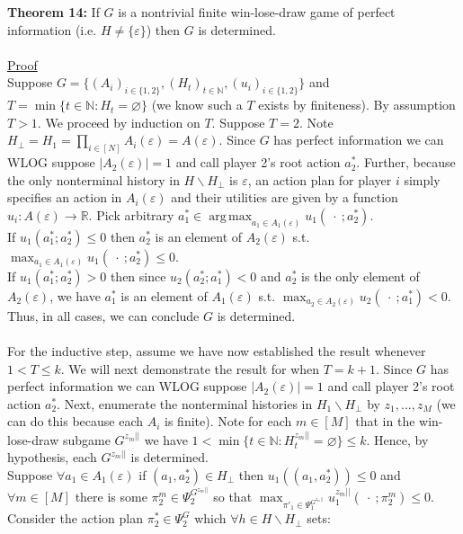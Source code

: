 \documentclass[11pt]{article}
\DeclareMathOperator*{\argmax}{arg\,max}
\theoremstyle{definition}
\theoremstyle{plain}
\begin{document}
\textbf{Theorem 14:} If $G$ is a nontrivial finite win-lose-draw game of perfect information (i.e. $H \neq \{\varepsilon\}$) then $G$ is determined.
\\
\\
\underline{Proof}
\\
Suppose $G=\{(A_i)_{i \in \{1,2\}}, (H_t)_{t \in \mathbb{N}}, (u_i)_{i \in \{1,2\}}\}$ and $T=\min\{t \in \mathbb{N} : H_t=\varnothing\}$ (we know such a $T$ exists by finiteness). By assumption $T>1$. We proceed by induction on $T$. Suppose $T=2$. Note $H_\bot = H_1 = \prod_{i \in [N]} A_i(\varepsilon)=A(\varepsilon)$. Since $G$ has perfect information we can WLOG suppose $|A_2(\varepsilon)|=1$ and call player 2's root action $a_2^*$. Further, because the only nonterminal history in $H \backslash H_{\bot}$ is $\varepsilon$, an action plan for player $i$ simply specifies an action in $A_i(\varepsilon)$ and their utilities are given by a function $u_i: A(\varepsilon) \to \mathbb{R}$. Pick arbitrary $a_1^* \in \argmax_{a_1 \in A_1(\varepsilon)} u_1(\ \cdot \ ; a_2^
*)$. 
\\
If $u_1(a^*_1;a^*_2) \leq 0$ then $a_2^*$ is an element of $A_2(\varepsilon)$ s.t. $\max_{a_1 \in A_1(\varepsilon)} u_1(\ \cdot \ ; a_2^*) \leq 0$. 
\\
If $u_1(a^*_1;a^*_2) > 0$ then since $u_2(a^*_2;a^*_1) < 0$ and $a_2^*$ is the only element of $A_2(\varepsilon)$, we have $a_1^*$ is an element of $A_1(\varepsilon)$ s.t. $\max_{a_2 \in A_2(\varepsilon)} u_2(\ \cdot \ ;a_1^* ) < 0$. 
\\
Thus, in all cases, we can conclude $G$ is determined.
\\
\\
For the inductive step, assume we have now established the result whenever $1<T \leq k$. We will next demonstrate the result for when $T=k+1$. Since $G$ has perfect information we can WLOG suppose $|A_2(\varepsilon)|=1$ and call player 2's root action $a_2^*$. Next, enumerate the nonterminal histories in $H_1 \backslash H_{\bot}$ by $z_1,...,z_M$ (we can do this because each $A_i$ is finite).  Note for each $m \in [M]$ that in the win-lose-draw subgame $G^{z_m||}$ we have $1<\min\{t \in \mathbb{N} : H^{z_m||}_t=\varnothing\}\leq k$. Hence, by hypothesis, each $G^{z_m||}$ is determined. 
\\
Suppose $\forall a_1 \in A_1(\varepsilon)$ if $(a_1,a^*_2) \in H_{\bot}$ then $u_1((a_1,a^*_2))\leq 0$ and $\forall m\in [M]$ there is some $\pi^m_2 \in \Psi^{G^{z_m||}}_2$ so that $\max_{\pi'_1 \in \Psi^{G^{z_m||}}_1} u^{z_m||}_1(\ \cdot \ ; \pi^m_2) \leq 0$. Consider the action plan $\pi^*_2 \in \Psi_2^G$ which $\forall h \in H\backslash H_{\bot}$ sets:
\end{document}
